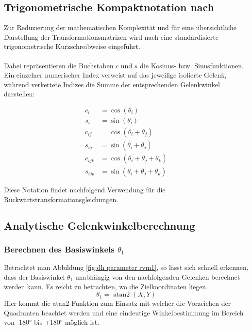 \subsection{Trigonometrische Kompaktnotation nach \cite{benbelkacem2011explicit}}
\label{kap:trigonometrische Notation}
Zur Reduzierung der mathematischen Komplexität und für eine übersichtliche Darstellung der Transformationsmatrizen wird nach \cite{benbelkacem2011explicit} eine standardisierte trigonometrische Kurzschreibweise eingeführt.\\
\\Dabei repräsentieren die Buchstaben $c$ und $s$ die Kosinus- bzw. Sinusfunktionen. Ein einzelner numerischer Index verweist auf das jeweilige isolierte Gelenk, während verkettete Indizes die Summe der entsprechenden Gelenkwinkel darstellen:

\begin{align}
	c_i &= \cos(\theta_i) \\
	s_i &= \sin(\theta_i) \\
	c_{ij} &= \cos(\theta_i + \theta_j) \\
	s_{ij} &= \sin(\theta_i + \theta_j) \\
	c_{ijk} &= \cos(\theta_i + \theta_j + \theta_k) \\
	s_{ijk} &= \sin(\theta_i + \theta_j + \theta_k)
\end{align}

Diese Notation findet nachfolgend Verwendung für die Rückwärtstransformationsgleichungen.
\subsection{Analytische Gelenkwinkelberechnung}
\label{kap:analytische gelenkwinkelberechnung}
\subsubsection*{Berechnen des Basiswinkels $\theta_{1}$}
Betrachtet man Abbildung \ref{fig:dh parameter rvm1}, so lässt sich schnell erkennen, dass der Basiswinkel $\theta_{1}$ unabhängig von den nachfolgenden Gelenken berechnet werden kann. Es reicht zu betrachten, wo die Zielkoordinaten liegen.
\begin{equation}
	\theta_1 = \operatorname{atan2}(X, Y)	
\end{equation}
Hier kommt die atan2-Funktion zum Einsatz mit welcher die Vorzeichen der Quadranten beachtet werden und eine eindeutige Winkelbestimmung im Bereich von -180° bis +180° möglich ist.
